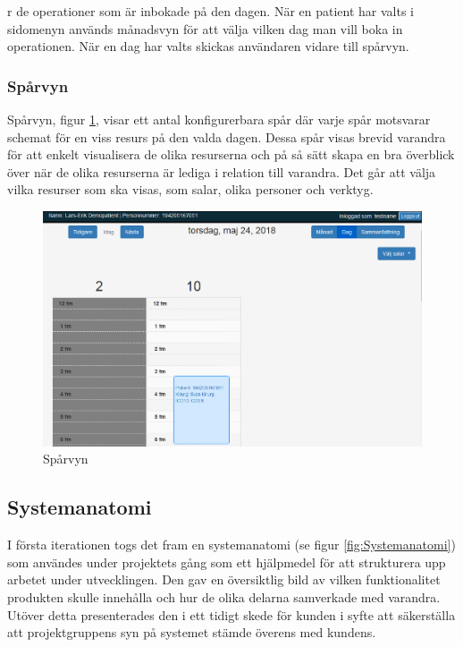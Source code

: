 r de operationer som är inbokade på den dagen. När en patient har valts i sidomenyn används månadsvyn för att välja vilken dag man vill boka in operationen. När en dag har valts skickas användaren vidare till spårvyn.

\subsubsection{Spårvyn}
Spårvyn, figur \ref{fig:track_view}, visar ett antal konfigurerbara spår där varje spår motsvarar schemat för en viss resurs på den valda dagen. Dessa spår visas brevid varandra för att enkelt visualisera de olika resurserna och på så sätt skapa en bra överblick över när de olika resurserna är lediga i relation till varandra. Det går att välja vilka resurser som ska visas, som salar, olika personer och verktyg.

\begin{figure}[H]
	\includegraphics[width=\linewidth]{Figures/track_view.png}
	\caption{Spårvyn}
	\label{fig:track_view}
\end{figure}

\subsection{Systemanatomi}
I första iterationen togs det fram en systemanatomi (se figur \ref{fig:Systemanatomi}) som användes under projektets gång som ett hjälpmedel för att strukturera upp arbetet under utvecklingen. Den gav en översiktlig bild av vilken funktionalitet produkten skulle innehålla och hur de olika delarna samverkade med varandra. Utöver detta presenterades den i ett tidigt skede för kunden i syfte att säkerställa att projektgruppens syn på systemet stämde överens med kundens.


